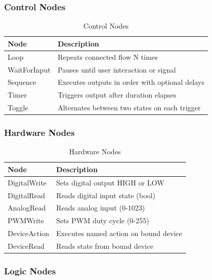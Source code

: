 \documentclass[11pt,a4paper]{article}
\begin{document}
\subsubsection{Control Nodes}

\begin{table}[H]
\centering
\begin{tabular}{@{}lp{8cm}@{}}
\toprule
\textbf{Node} & \textbf{Description} \\
\midrule
Loop & Repeats connected flow N times \\
WaitForInput & Pauses until user interaction or signal \\
Sequence & Executes outputs in order with optional delays \\
Timer & Triggers output after duration elapses \\
Toggle & Alternates between two states on each trigger \\
\bottomrule
\end{tabular}
\caption{Control Nodes}
\end{table}

\subsubsection{Hardware Nodes}

\begin{table}[H]
\centering
\begin{tabular}{@{}lp{8cm}@{}}
\toprule
\textbf{Node} & \textbf{Description} \\
\midrule
DigitalWrite & Sets digital output HIGH or LOW \\
DigitalRead & Reads digital input state (bool) \\
AnalogRead & Reads analog input (0-1023) \\
PWMWrite & Sets PWM duty cycle (0-255) \\
DeviceAction & Executes named action on bound device \\
DeviceRead & Reads state from bound device \\
\bottomrule
\end{tabular}
\caption{Hardware Nodes}
\end{table}

\subsubsection{Logic Nodes}
\end{document}
